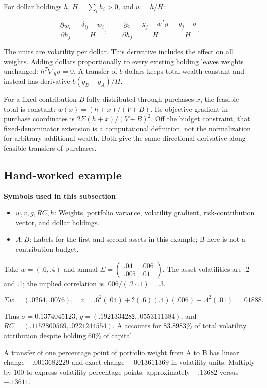 \documentclass[
  american,
  11pt,
]{article}
\begin{document}
For dollar holdings \(h\), \(H=\sum_i h_i>0\), and \(w=h/H\):

\[\frac{\partial w_i}{\partial h_j}=\frac{\delta_{ij}-w_i}{H},\qquad
\frac{\partial\sigma}{\partial h_j}=\frac{g_j-w^Tg}{H}=\frac{g_j-\sigma}{H}.\]

The units are volatility per dollar. This derivative includes the effect
on all weights. Adding dollars proportionally to every existing holding
leaves weights unchanged: \(h^T\nabla_h\sigma=0\). A transfer of \(b\)
dollars keeps total wealth constant and instead has derivative
\(b(g_B-g_A)/H\).

For a fixed contribution \(B\) fully distributed through purchases
\(x\), the feasible total is constant: \(w(x)=(h+x)/(V+B)\). Its
objective gradient in purchase coordinates is \(2\Sigma(h+x)/(V+B)^2\).
Off the budget constraint, that fixed-denominator extension is a
computational definition, not the normalization for arbitrary additional
wealth. Both give the same directional derivative along feasible
transfers of purchases.

\subsection{Hand-worked example}\label{hand-worked-example}

\textbf{Symbols used in this subsection}
\begin{itemize}
\item \(w,v,g,RC,h\): Weights, portfolio variance, volatility gradient, risk-contribution vector, and dollar holdings.
\item \(A,B\): Labels for the first and second assets in this example; B here is not a contribution budget.
\end{itemize}


Take \(w=(.6,.4)\) and annual
\(\Sigma=\begin{pmatrix}.04&.006\\.006&.01\end{pmatrix}\). The asset
volatilities are .2 and .1; the implied correlation is
\(.006/(.2\cdot.1)=.3\).

\[\Sigma w=(.0264,.0076),\quad
v=.6^2(.04)+2(.6)(.4)(.006)+.4^2(.01)=.01888.\]

Thus \(\sigma=0.1374045123\), \(g=(.1921334282,.0553111384)\), and
\(RC=(.1152800569,.0221244554)\). A accounts for 83.8983\% of total
volatility attribution despite holding 60\% of capital.

A transfer of one percentage point of portfolio weight from A to B has
linear change \(-.0013682229\) and exact change \(-.0013611369\) in
volatility units. Multiply by 100 to express volatility percentage
points: approximately \(-.13682\) versus \(-.13611\).
\end{document}
